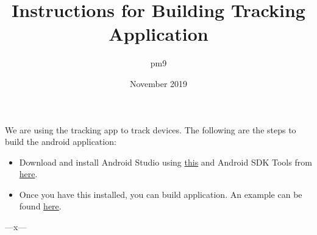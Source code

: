 \documentclass{article}
\title{Instructions for Building Tracking Application}
\author{pm9}
\date{November 2019}
\begin{document}
\maketitle

We are using the tracking app to track devices. The following are the steps to build the android application:
\begin{itemize}
    \item 
    Download and install Android Studio using \href{https://developer.android.com/studio/install}{this} and Android SDK Tools from \href{http://www.androiddocs.com/sdk/installing/index.html}{here}.
    \item
    Once you have this installed, you can build application. An example can be found \href{https://developer.android.com/studio/run}{here}.
\end{itemize}
\begin{center}
---x---
\end{center}
\end{document}
